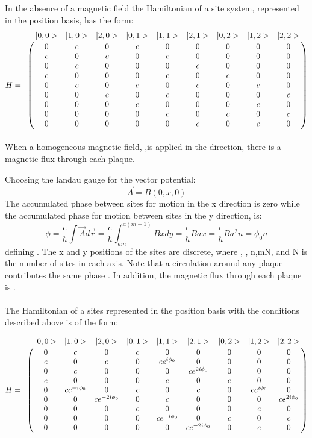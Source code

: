 \documentclass[11pt,fleqn]{article}
\begin{document}
In the absence of a magnetic field the Hamiltonian of a \endmath \space site system, represented in the position basis, has the form:
$$H = \bordermatrix {
&|0,0>&|1,0>&|2,0>&|0,1>&|1,1>&|2,1>&|0,2>&|1,2>&|2,2>\cr
 &0&c&0&c&0&0&0&0&0\cr
 &c&0&c&0&c&0&0&0&0\cr
 &0&c&0&0&0&c&0&0&0\cr
 &c&0&0&0&c&0&c&0&0\cr
 &0&c&0&c&0&c&0&c&0\cr
 &0&0&c&0&c&0&0&0&c\cr
 &0&0&0&c&0&0&0&c&0\cr
 &0&0&0&0&c&0&c&0&c\cr
 &0&0&0&0&0&c&0&c&0}$$
\paragraph{}
When a homogeneous magnetic field,\space\math{}
\endmath,\space is applied in the \math{}\endmath\space direction, there is a magnetic flux \math{\Phi}\endmath \space through each plaque. 

Choosing the landau gauge for the vector potential:
 \begin{equation} \vec{A}=B(0,x,0)
 \end{equation}
 The accumulated phase between sites for motion in the x direction is zero while the accumulated phase for motion between sites in the y direction, \endmath \space is: \begin{equation} \phi=\frac{e}{\hbar}\int\vec{A} d\vec{r}=\frac{e}{\hbar} \int_{am}^{a(m+1)}  Bx dy {=\frac{e}{\hbar}Bax=\frac{e}{\hbar}Ba^2n=\phi_0n} \end{equation}
defining  \endmath. \newline \newline
 The x and y positions of the sites are discrete, where \endmath ,  \endmath, \space \newline
 \leq n,m\leq N, \endmath \space and N is the number of sites in each axis. 
 Note that a circulation around any plaque contributes the same phase \endmath. In addition, the magnetic flux through each plaque is \endmath.

\paragraph{}

The Hamiltonian of a \endmath \space sites represented in the position basis with the conditions described above is of the form:

$$
H = \bordermatrix {
&|0,0>&|1,0>&|2,0>&|0,1>&|1,1>&|2,1>&|0,2>&|1,2>&|2,2>\cr
 &0&c&0&c&0&0&0&0&0\cr
 &c&0&c&0&ce^{i\phi_0}&0&0&0&0\cr
 &0&c&0&0&0&ce^{2i\phi_0}&0&0&0\cr
 &c&0&0&0&c&0&c&0&0\cr
 &0&ce^{-i\phi_0}&0&c&0&c&0&ce^{i\phi_0}&0\cr
 &0&0&ce^{-2i\phi_0}&0&c&0&0&0&ce^{2i\phi_0}\cr
 &0&0&0&c&0&0&0&c&0\cr
 &0&0&0&0&ce^{-i\phi_0}&0&c&0&c\cr
 &0&0&0&0&0&ce^{-2i\phi_0}&0&c&0}
$$
\end{document}
